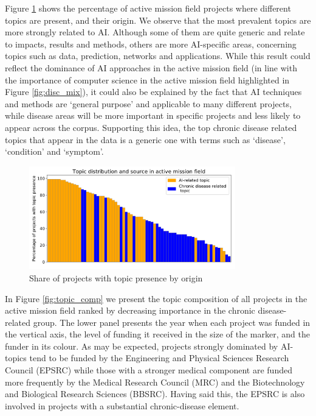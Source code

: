 \documentclass[11pt]{article}
\begin{document}
\label{tab:topics}

Figure \ref{fig:topic_distr} shows the percentage of active mission field projects where different topics are present, and their origin. We observe that the most prevalent topics are more strongly related to AI. Although some of them are quite generic and relate to impacts, results and methods, others are more AI-specific areas, concerning topics such as data, prediction, networks and applications. While this result could reflect the dominance of AI approaches in the active mission field (in line with the importance of computer science in the active mission field highlighted in Figure \ref{fig:disc_mix}), it could also be explained by the fact that AI techniques and methods are `general purpose' and applicable to many different projects, while disease areas will be more important in specific projects and less likely to appear across the corpus. Supporting this idea, the top chronic disease related topics that appear in the data is a generic one with terms such as `disease', `condition' and `symptom'. 

\begin{figure}[!ht]
    \centering
    \includegraphics[width=0.8\textwidth]{figures/fig_18_distr.pdf}
    \caption{Share of projects with topic presence by origin}
    \label{fig:topic_distr}
\end{figure}

In Figure \ref{fig:topic_comp} we present the topic composition of all projects in the active mission field ranked by decreasing importance in the chronic disease-related group. The lower panel presents the year when each project was funded in the vertical axis, the level of funding it received in the size of the marker, and the funder in its colour. As may be expected, projects strongly dominated by AI-topics tend to be funded by the Engineering and Physical Sciences Research Council (EPSRC) while those with a stronger medical component are funded more frequently by the Medical Research Council (MRC) and the Biotechnology and Biological Research Sciences (BBSRC). Having said this, the EPSRC is also involved in projects with a substantial chronic-disease element. 
\end{document}
